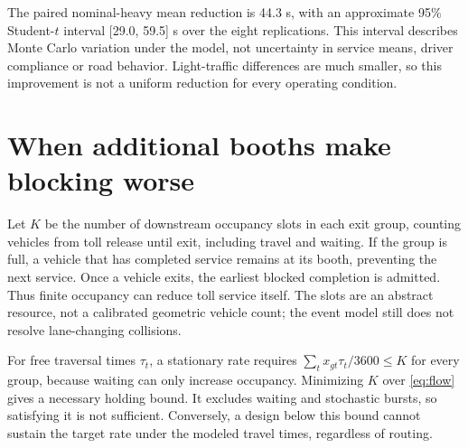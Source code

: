 \documentclass[12pt,letterpaper]{article}
\begin{document}
The paired nominal-heavy mean reduction is 44.3 s, with an approximate 95\% Student-$t$ interval [29.0, 59.5] s over the eight replications. This interval describes Monte Carlo variation under the model, not uncertainty in service means, driver compliance or road behavior. Light-traffic differences are much smaller, so this improvement is not a uniform reduction for every operating condition.

\section{When additional booths make blocking worse}
Let $K$ be the number of downstream occupancy slots in each exit group, counting vehicles from toll release until exit, including travel and waiting. If the group is full, a vehicle that has completed service remains at its booth, preventing the next service. Once a vehicle exits, the earliest blocked completion is admitted. Thus finite occupancy can reduce toll service itself. The slots are an abstract resource, not a calibrated geometric vehicle count; the event model still does not resolve lane-changing collisions.

For free traversal times $\tau_t$, a stationary rate requires $\sum_t x_{gt}\tau_t/3600\le K$ for every group, because waiting can only increase occupancy. Minimizing $K$ over \eqref{eq:flow} gives a necessary holding bound. It excludes waiting and stochastic bursts, so satisfying it is not sufficient. Conversely, a design below this bound cannot sustain the target rate under the modeled travel times, regardless of routing.
\end{document}
